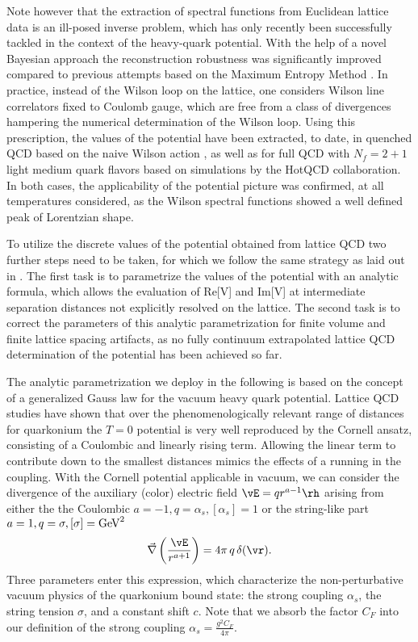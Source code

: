 Note however that the extraction of spectral functions from Euclidean lattice data is an ill-posed inverse problem, which has only recently been successfully tackled in the context of the heavy-quark potential. With the help of a novel Bayesian approach \cite{Burnier:2013nla} the reconstruction robustness was significantly improved compared to previous attempts based on the Maximum Entropy Method \cite{Rothkopf:2011db}. In practice, instead of the Wilson loop on the lattice, one considers Wilson line correlators fixed to Coulomb gauge, which are free from a class of divergences hampering the numerical determination of the Wilson loop.  Using this prescription, the values of the potential have been extracted, to date, in quenched QCD based on the naive Wilson action \cite{Burnier:2016mxc}, as well as for full QCD with $N_f=2+1$ light medium quark flavors based on simulations by the HotQCD collaboration. In both cases, the applicability of the potential picture was confirmed, at all temperatures considered, as the Wilson spectral functions showed a well defined peak of Lorentzian shape. 

To utilize the discrete values of the potential obtained from lattice QCD two further steps need to be taken, for which we follow the same strategy as laid out in \cite{Burnier:2015tda,Burnier:2016kqm}. The first task is to parametrize the values of the potential with an analytic formula, which allows the evaluation of Re[V] and Im[V] at intermediate separation distances not explicitly resolved on the lattice. The second task is to correct the parameters of this analytic parametrization for finite volume and finite lattice spacing artifacts, as no fully continuum extrapolated lattice QCD determination of the potential has been achieved so far.

The analytic parametrization we deploy in the following is based on the concept of a generalized Gauss law for the vacuum heavy quark potential. Lattice QCD studies have shown that over the phenomenologically relevant range of distances for quarkonium the $T=0$ potential is very well reproduced by the Cornell ansatz, consisting of a Coulombic and linearly rising term. Allowing the linear term to contribute down to the smallest distances mimics the effects of a running in the coupling. With the Cornell potential applicable in vacuum, we can consider the divergence of  the auxiliary (color) electric field $\vE=q r^{a-1} \rh$ arising from either the the Coulombic $a=-1, q=\alpha_s, [\alpha_s]=1$ or the string-like part $a=1, q=\sigma, [\sigma]={\rm GeV}^2$
\begin{align}
\vec\nabla \left(\frac{\vE}{r^{a+1}}\right)=   4\pi \,q\, \delta(\vr) \label{Eq:GenGauss}.
\end{align}
Three parameters enter this expression, which characterize the non-perturbative vacuum physics of the quarkonium bound state: the strong coupling $\alpha_s$, the string tension $\sigma$, and a constant shift $c$. Note that we absorb the factor $C_F$ into our definition of the strong coupling $\alpha_s=\frac{g^2C_F}{4\pi}$.

